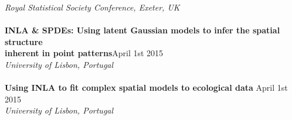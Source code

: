 \documentclass[10pt,letter]{article}
\begin{document}
                                                          {\sl Royal Statistical Society Conference, Exeter, UK}\\
                                                          \hdashrule[0.5ex]{4cm}{1pt}{1pt}\\
                                                          \textbf{INLA \& SPDEs: 
                                                            Using latent Gaussian models to infer the spatial structure \\
                                                            inherent in point patterns}\hfill April 1st 2015\\
                                                                 {\sl University of Lisbon, Portugal}\\
                                                                 \hdashrule[0.5ex]{4cm}{1pt}{1pt}\\
                                                                 \textbf{Using INLA to fit complex spatial models to ecological data } \hfill April 1st 2015\\
                                                                        {\sl University of Lisbon, Portugal}\\
\newpage
\end{document}
